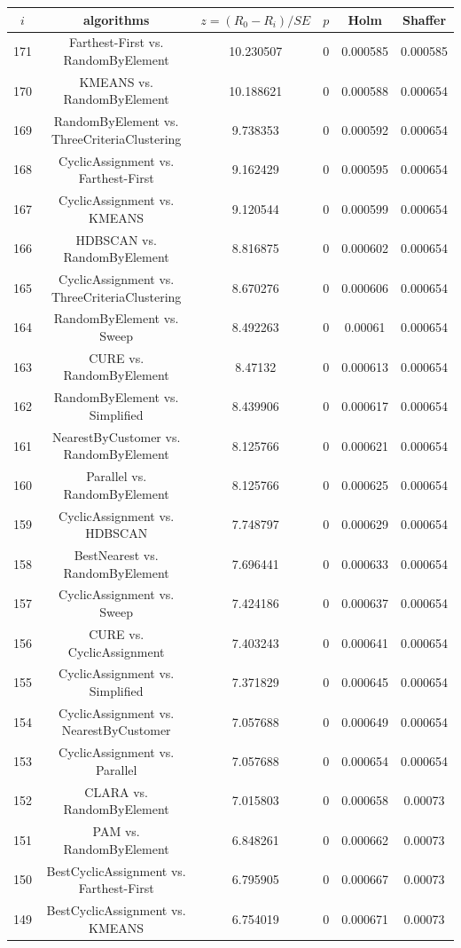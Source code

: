 \documentclass[a4paper,10pt]{article}
\begin{document}
\begin{landscape}
\begin{table}[!htp]
\centering\scriptsize
\begin{tabular}{cccccc}
$i$&algorithms&$z=(R_0 - R_i)/SE$&$p$&Holm&Shaffer\\
\hline171&Farthest-First vs. RandomByElement&10.230507&0&0.000585&0.000585\\
170&KMEANS vs. RandomByElement&10.188621&0&0.000588&0.000654\\
169&RandomByElement vs. ThreeCriteriaClustering&9.738353&0&0.000592&0.000654\\
168&CyclicAssignment vs. Farthest-First&9.162429&0&0.000595&0.000654\\
167&CyclicAssignment vs. KMEANS&9.120544&0&0.000599&0.000654\\
166&HDBSCAN vs. RandomByElement&8.816875&0&0.000602&0.000654\\
165&CyclicAssignment vs. ThreeCriteriaClustering&8.670276&0&0.000606&0.000654\\
164&RandomByElement vs. Sweep&8.492263&0&0.00061&0.000654\\
163&CURE vs. RandomByElement&8.47132&0&0.000613&0.000654\\
162&RandomByElement vs. Simplified&8.439906&0&0.000617&0.000654\\
161&NearestByCustomer vs. RandomByElement&8.125766&0&0.000621&0.000654\\
160&Parallel vs. RandomByElement&8.125766&0&0.000625&0.000654\\
159&CyclicAssignment vs. HDBSCAN&7.748797&0&0.000629&0.000654\\
158&BestNearest vs. RandomByElement&7.696441&0&0.000633&0.000654\\
157&CyclicAssignment vs. Sweep&7.424186&0&0.000637&0.000654\\
156&CURE vs. CyclicAssignment&7.403243&0&0.000641&0.000654\\
155&CyclicAssignment vs. Simplified&7.371829&0&0.000645&0.000654\\
154&CyclicAssignment vs. NearestByCustomer&7.057688&0&0.000649&0.000654\\
153&CyclicAssignment vs. Parallel&7.057688&0&0.000654&0.000654\\
152&CLARA vs. RandomByElement&7.015803&0&0.000658&0.00073\\
151&PAM vs. RandomByElement&6.848261&0&0.000662&0.00073\\
150&BestCyclicAssignment vs. Farthest-First&6.795905&0&0.000667&0.00073\\
149&BestCyclicAssignment vs. KMEANS&6.754019&0&0.000671&0.00073\\

\end{tabular}
\end{table}
\end{landscape}
\end{document}
